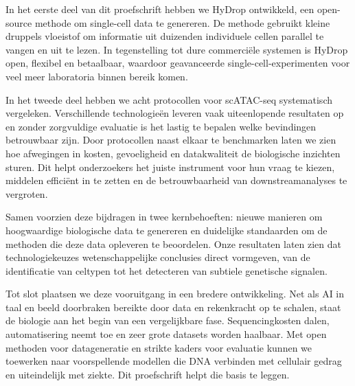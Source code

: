 In het eerste deel van dit proefschrift hebben we HyDrop ontwikkeld, een open-source methode om single-cell data te genereren. De methode gebruikt kleine druppels vloeistof om informatie uit duizenden individuele cellen parallel te vangen en uit te lezen. In tegenstelling tot dure commerciële systemen is HyDrop open, flexibel en betaalbaar, waardoor geavanceerde single-cell-experimenten voor veel meer laboratoria binnen bereik komen.

In het tweede deel hebben we acht protocollen voor scATAC-seq systematisch vergeleken. Verschillende technologieën leveren vaak uiteenlopende resultaten op en zonder zorgvuldige evaluatie is het lastig te bepalen welke bevindingen betrouwbaar zijn. Door protocollen naast elkaar te benchmarken laten we zien hoe afwegingen in kosten, gevoeligheid en datakwaliteit de biologische inzichten sturen. Dit helpt onderzoekers het juiste instrument voor hun vraag te kiezen, middelen efficiënt in te zetten en de betrouwbaarheid van downstreamanalyses te vergroten.

Samen voorzien deze bijdragen in twee kernbehoeften: nieuwe manieren om hoogwaardige biologische data te genereren en duidelijke standaarden om de methoden die deze data opleveren te beoordelen. Onze resultaten laten zien dat technologiekeuzes wetenschappelijke conclusies direct vormgeven, van de identificatie van celtypen tot het detecteren van subtiele genetische signalen.

Tot slot plaatsen we deze vooruitgang in een bredere ontwikkeling. Net als AI in taal en beeld doorbraken bereikte door data en rekenkracht op te schalen, staat de biologie aan het begin van een vergelijkbare fase. Sequencingkosten dalen, automatisering neemt toe en zeer grote datasets worden haalbaar. Met open methoden voor datageneratie en strikte kaders voor evaluatie kunnen we toewerken naar voorspellende modellen die DNA verbinden met cellulair gedrag en uiteindelijk met ziekte. Dit proefschrift helpt die basis te leggen.